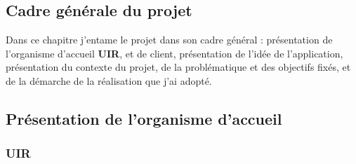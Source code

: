 \documentclass[a4paper]{report}
\begin{document}
\begin{doublespace}
	\newpage

	 \setcounter{page}{1}
	\chapter{Cadre générale du projet}
	\fancyhead[L]{\hspace*{5cm}}
	Dans ce chapitre j'entame le projet dans son cadre général : présentation
	de l’organisme d’accueil \textbf{UIR},
	et de client, présentation de l'idée de l'application, présentation du
	contexte du projet, de la problématique et des objectifs fixés,
	et de la démarche de la réalisation que j'ai adopté.
	\section{Présentation de l’organisme d’accueil}
	\subsection{UIR}


\end{doublespace}
\end{document}

